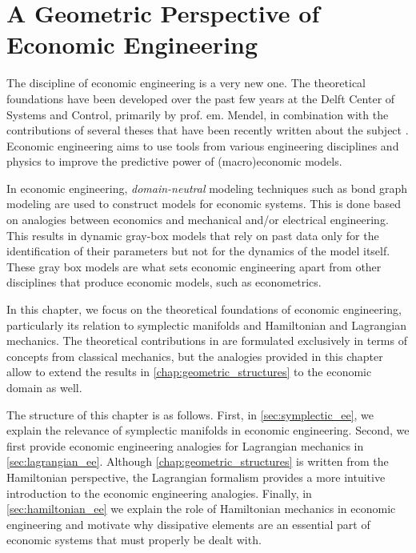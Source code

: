 \chapter{A Geometric Perspective of Economic Engineering}
\label{chap:symplectic_economics}

The discipline of economic engineering is a very new one. The theoretical foundations have been developed over the past few years at the Delft Center of Systems and Control, primarily by prof. em. Mendel,  in combination with the contributions of several theses that have been recently written about the subject \cite{Hutters2020,Kruimer2021,VanArdenne2020,Manders2019}. Economic engineering aims to use tools from various engineering disciplines and physics to improve the predictive power of (macro)economic models.

In economic engineering, \emph{domain-neutral} modeling techniques such as bond graph modeling are used to construct models for economic systems. This is done based on analogies between economics and mechanical and/or electrical engineering. This results in dynamic gray-box models that rely on past data only for the identification of their parameters but not for the dynamics of the model itself. These gray box models are what sets economic engineering apart from other disciplines that produce economic models, such as econometrics.

In this chapter, we focus on the theoretical foundations of economic engineering, particularly its relation to symplectic manifolds and Hamiltonian and Lagrangian mechanics. The theoretical contributions in  are formulated exclusively in terms of concepts from classical mechanics, but the analogies provided in this chapter allow to extend the results in \cref{chap:geometric_structures} to the economic domain as well.

The structure of this chapter is as follows. First, in \cref{sec:symplectic_ee}, we explain the relevance of symplectic manifolds in economic engineering. Second, we first provide economic engineering analogies for Lagrangian mechanics in \cref{sec:lagrangian_ee}. Although \cref{chap:geometric_structures} is written from the Hamiltonian perspective, the Lagrangian formalism provides a more intuitive introduction to the economic engineering analogies. Finally, in \cref{sec:hamiltonian_ee} we explain the role of Hamiltonian mechanics in economic engineering and motivate why dissipative elements are an essential part of economic systems that must properly be dealt with.

